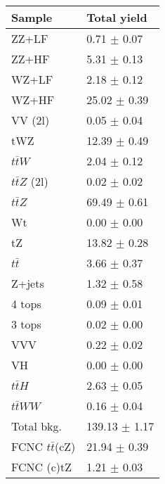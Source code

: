 	\begin{tabular}{|l|l|}
	\hline
	\textbf{Sample}                  			 & \textbf{Total yield}     \\
	\hline
	ZZ+LF                 & 0.71 $\pm$ 0.07          \\   
	ZZ+HF                 & 5.31 $\pm$ 0.13         \\   
	WZ+LF                  & 2.18 $\pm$ 0.12         \\   
	WZ+HF                  & 25.02 $\pm$ 0.39         \\   
	VV (2l)                 					  & 0.05 $\pm$ 0.04                             \\   
	tWZ                       					  & 12.39 $\pm$ 0.49                                \\   
	$t\bar{t}W$             					  & 2.04 $\pm$ 0.12                             \\   
	$t\bar{t}Z$ (2l)       					      & 0.02 $\pm$ 0.02                             \\   
	$t\bar{t}Z$           &69.49 $\pm$ 0.61   \\   
	Wt                      					  & 0.00 $\pm$ 0.00                           \\   
	tZ                      					  & 13.82 $\pm$ 0.28                            \\     
	$t\bar{t}$             						  & 3.66 $\pm$ 0.37                            \\   
	Z+jets                 						  & 1.32 $\pm$ 0.58                            \\   
	4 tops                 						  & 0.09 $\pm$ 0.01                           \\   
	3 tops                 						  & 0.02 $\pm$ 0.00                           \\   
	VVV                     					  & 0.22 $\pm$ 0.02                           \\   
	VH                      					  & 0.00 $\pm$ 0.00                           \\   
	$t\bar{t}H$             					  & 2.63 $\pm$ 0.05                           \\   
	$t\bar{t}WW$          					      & 0.16 $\pm$ 0.04                           \\   
	\hline                                                                    
	Total bkg.              					  &  139.13 $\pm$ 1.17                          \\       
	\hline                                                                     
	FCNC $t\bar{t}$(cZ)   					      &  21.94 $\pm$ 0.39                \\
	FCNC (c)tZ              				      &  1.21 $\pm$ 0.03                          \\
	\hline
\end{tabular}
